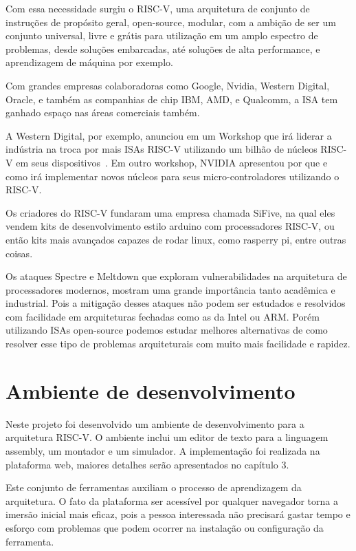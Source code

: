 		Com essa necessidade surgiu o RISC-V, uma arquitetura de conjunto de instruções de propósito geral, open-source, modular, com a ambição de ser um conjunto universal, livre e grátis para utilização em um amplo espectro de problemas, desde soluções embarcadas, até soluções de alta performance, e aprendizagem de máquina por exemplo.

		Com grandes empresas colaboradoras como Google, Nvidia, Western Digital, Oracle, e também as companhias de chip IBM, AMD, e Qualcomm, a ISA tem ganhado espaço nas áreas comerciais também.

		A Western Digital, por exemplo, anunciou em um Workshop que irá liderar a indústria na troca por mais ISAs RISC-V utilizando um bilhão de núcleos RISC-V em seus dispositivos~\cite{riscv_commercial}. Em outro workshop, NVIDIA apresentou por que e como irá implementar novos núcleos para seus micro-controladores utilizando o RISC-V.~\cite{riscv_nvidia}

		Os criadores do RISC-V fundaram uma empresa chamada SiFive, na qual eles vendem kits de desenvolvimento estilo arduino com processadores RISC-V, ou então kits mais avançados capazes de rodar linux, como rasperry pi, entre outras coisas.

		Os ataques Spectre e Meltdown que exploram vulnerabilidades na arquitetura de processadores modernos, mostram uma grande importância tanto acadêmica e industrial. Pois a mitigação desses ataques não podem ser estudados e resolvidos com facilidade em arquiteturas fechadas como as da Intel ou ARM. Porém utilizando ISAs open-source podemos estudar melhores alternativas de como resolver esse tipo de problemas arquiteturais com muito mais facilidade e rapidez.



	\section{Ambiente de desenvolvimento}

		Neste projeto foi desenvolvido um ambiente de desenvolvimento para a arquitetura RISC-V. O ambiente inclui um editor de texto para a linguagem assembly, um montador e um simulador. A implementação foi realizada na plataforma web, maiores detalhes serão apresentados no capítulo 3. 

		Este conjunto de ferramentas auxiliam o processo de aprendizagem da arquitetura. O fato da plataforma ser acessível por qualquer navegador torna a imersão inicial mais eficaz, pois a pessoa interessada não precisará gastar tempo e esforço com problemas que podem ocorrer na instalação ou configuração da ferramenta.

